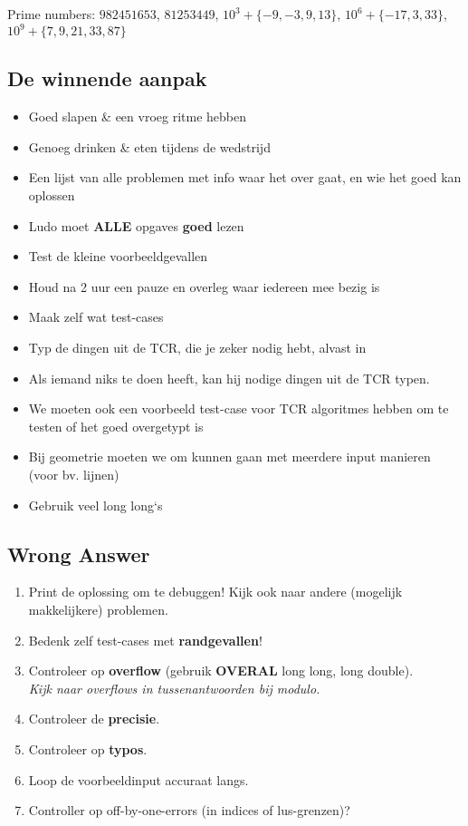 \documentclass{article}
\begin{document}
Prime numbers: $\mathit{982451653}$, $\mathit{81253449}$, $10^3 + \{-9,-3,9,13\}$, $10^6 + \{-17, 3, 33\}$, $10^9 + \{7,9,21,33,87\}$

\subsection{De winnende aanpak}

\begin{itemize}
	\setlength\itemsep{-.25em}
	\item Goed slapen \& een vroeg ritme hebben
	\item Genoeg drinken \& eten tijdens de wedstrijd
	\item Een lijst van alle problemen met info waar het over gaat, en wie het goed kan oplossen
	\item Ludo moet \textbf{ALLE} opgaves \textbf{goed} lezen
	\item Test de kleine voorbeeldgevallen
	\item Houd na 2 uur een pauze en overleg waar iedereen mee bezig is
	\item Maak zelf wat test-cases
	\item Typ de dingen uit de TCR, die je zeker nodig hebt, alvast in
	\item Als iemand niks te doen heeft, kan hij nodige dingen uit de TCR typen.
	\item We moeten ook een voorbeeld test-case voor TCR algoritmes hebben om te testen of het goed overgetypt is
	\item Bij geometrie moeten we om kunnen gaan met meerdere input manieren (voor bv. lijnen)
	\item Gebruik veel long long`s
\end{itemize}

\subsection{Wrong Answer}

\begin{enumerate}
	\setlength\itemsep{-.25em}
	\item Print de oplossing om te debuggen! Kijk ook naar andere (mogelijk makkelijkere) problemen.
	\item Bedenk zelf test-cases met \textbf{randgevallen}!
	\item Controleer op \textbf{overflow} (gebruik \textbf{OVERAL} long long, long double).
		\\ \textit{Kijk naar overflows in tussenantwoorden bij modulo.}
	\item Controleer de \textbf{precisie}.
	\item Controleer op \textbf{typo\textquotesingle s}.
	\item Loop de voorbeeldinput accuraat langs.
	\item Controller op off-by-one-errors (in indices of lus-grenzen)?
\end{enumerate}
\end{document}
